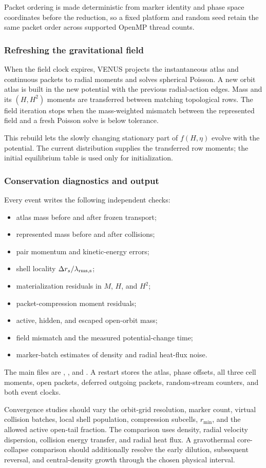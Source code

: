 Packet ordering is made deterministic from marker identity and phase space
coordinates before the reduction, so a fixed platform and random seed retain
the same packet order across supported OpenMP thread counts.

\subsubsection{Refreshing the gravitational field}

When the field clock expires, VENUS projects the instantaneous atlas and
continuous packets to radial moments and solves spherical Poisson.  A new
orbit atlas is built in the new potential with the previous radial-action
edges.  Mass and its \((H,H^2)\) moments are transferred between matching
topological rows.  The field iteration stops when the mass-weighted mismatch
between the represented field and a fresh Poisson solve is below tolerance.

This rebuild lets the slowly changing stationary part of \(f(H,\eta)\) evolve
with the potential.  The current distribution supplies the transferred row
moments; the initial equilibrium table is used only for initialization.

\subsubsection{Conservation diagnostics and output}

Every event writes the following independent checks:
\begin{itemize}
\item atlas mass before and after frozen transport;
\item represented mass before and after collisions;
\item pair momentum and kinetic-energy errors;
\item shell locality \(\Delta r_s/\lambda_{\rm rms,s}\);
\item materialization residuals in \(M\), \(H\), and \(H^2\);
\item packet-compression moment residuals;
\item active, hidden, and escaped open-orbit mass;
\item field mismatch and the measured potential-change time;
\item marker-batch estimates of density and radial heat-flux noise.
\end{itemize}

The main files are , , and
.  A restart stores the atlas, phase offsets,
all three cell moments, open packets, deferred outgoing packets, random-stream
counters, and both event clocks.

Convergence studies should vary the orbit-grid resolution, marker count,
virtual collision batches, local shell population, compression subcells,
\(r_{\min}\), and the allowed active open-tail fraction.  The comparison uses
density, radial velocity dispersion, collision energy transfer, and radial
heat flux.  A gravothermal core-collapse comparison should additionally
resolve the early dilution, subsequent reversal, and central-density growth
through the chosen physical interval.
